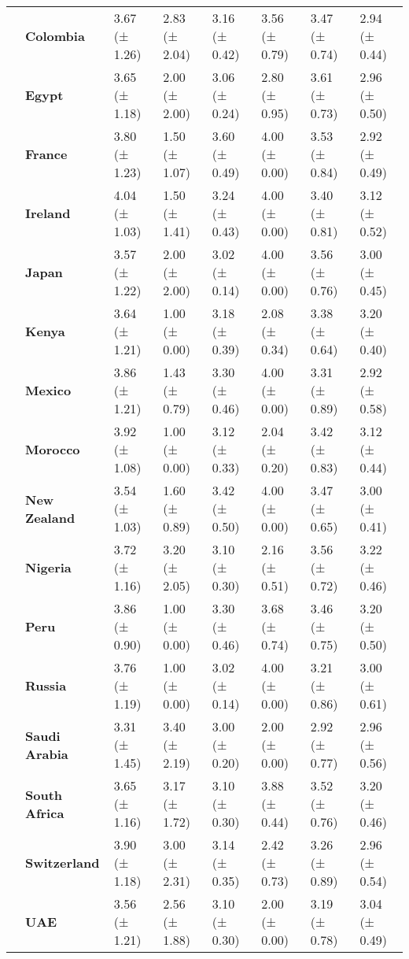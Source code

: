 \begin{tabular}{llllllll}
\textbf{} & \textbf{Colombia} & 3.67 (± 1.26) & 2.83 (± 2.04) & 3.16 (± 0.42) & 3.56 (± 0.79) & 3.47 (± 0.74) & 2.94 (± 0.44) \\
\textbf{} & \textbf{Egypt} & 3.65 (± 1.18) & 2.00 (± 2.00) & 3.06 (± 0.24) & 2.80 (± 0.95) & 3.61 (± 0.73) & 2.96 (± 0.50) \\
\textbf{} & \textbf{France} & 3.80 (± 1.23) & 1.50 (± 1.07) & 3.60 (± 0.49) & 4.00 (± 0.00) & 3.53 (± 0.84) & 2.92 (± 0.49) \\
\textbf{} & \textbf{Ireland} & 4.04 (± 1.03) & 1.50 (± 1.41) & 3.24 (± 0.43) & 4.00 (± 0.00) & 3.40 (± 0.81) & 3.12 (± 0.52) \\
\textbf{} & \textbf{Japan} & 3.57 (± 1.22) & 2.00 (± 2.00) & 3.02 (± 0.14) & 4.00 (± 0.00) & 3.56 (± 0.76) & 3.00 (± 0.45) \\
\textbf{} & \textbf{Kenya} & 3.64 (± 1.21) & 1.00 (± 0.00) & 3.18 (± 0.39) & 2.08 (± 0.34) & 3.38 (± 0.64) & 3.20 (± 0.40) \\
\textbf{} & \textbf{Mexico} & 3.86 (± 1.21) & 1.43 (± 0.79) & 3.30 (± 0.46) & 4.00 (± 0.00) & 3.31 (± 0.89) & 2.92 (± 0.58) \\
\textbf{} & \textbf{Morocco} & 3.92 (± 1.08) & 1.00 (± 0.00) & 3.12 (± 0.33) & 2.04 (± 0.20) & 3.42 (± 0.83) & 3.12 (± 0.44) \\
\textbf{} & \textbf{New Zealand} & 3.54 (± 1.03) & 1.60 (± 0.89) & 3.42 (± 0.50) & 4.00 (± 0.00) & 3.47 (± 0.65) & 3.00 (± 0.41) \\
\textbf{} & \textbf{Nigeria} & 3.72 (± 1.16) & 3.20 (± 2.05) & 3.10 (± 0.30) & 2.16 (± 0.51) & 3.56 (± 0.72) & 3.22 (± 0.46) \\
\textbf{} & \textbf{Peru} & 3.86 (± 0.90) & 1.00 (± 0.00) & 3.30 (± 0.46) & 3.68 (± 0.74) & 3.46 (± 0.75) & 3.20 (± 0.50) \\
\textbf{} & \textbf{Russia} & 3.76 (± 1.19) & 1.00 (± 0.00) & 3.02 (± 0.14) & 4.00 (± 0.00) & 3.21 (± 0.86) & 3.00 (± 0.61) \\
\textbf{} & \textbf{Saudi Arabia} & 3.31 (± 1.45) & 3.40 (± 2.19) & 3.00 (± 0.20) & 2.00 (± 0.00) & 2.92 (± 0.77) & 2.96 (± 0.56) \\
\textbf{} & \textbf{South Africa} & 3.65 (± 1.16) & 3.17 (± 1.72) & 3.10 (± 0.30) & 3.88 (± 0.44) & 3.52 (± 0.76) & 3.20 (± 0.46) \\
\textbf{} & \textbf{Switzerland} & 3.90 (± 1.18) & 3.00 (± 2.31) & 3.14 (± 0.35) & 2.42 (± 0.73) & 3.26 (± 0.89) & 2.96 (± 0.54) \\
\textbf{} & \textbf{UAE} & 3.56 (± 1.21) & 2.56 (± 1.88) & 3.10 (± 0.30) & 2.00 (± 0.00) & 3.19 (± 0.78) & 3.04 (± 0.49) \\

\end{tabular}
